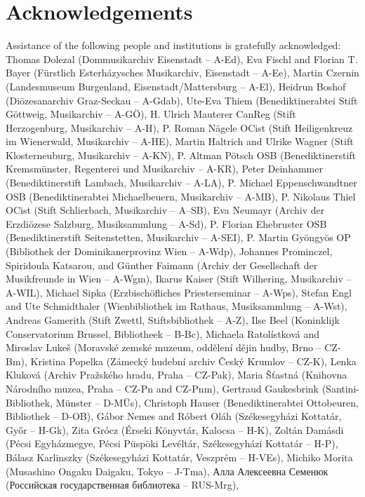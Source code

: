 \documentclass{ees}
\begin{document}
\section{Acknowledgements}

Assistance of the following people and institutions is gratefully acknowledged:
Thomas Dolezal (Dommusikarchiv Eisenstadt – A-Ed),
Eva Fischl and Florian T. Bayer (Fürstlich Esterházysches Musikarchiv, Eisenstadt – A-Ee),
Martin Czernin (Landesmuseum Burgenland, Eisenstadt/Mattersburg – A-El),
Heidrun Boshof (Diözesanarchiv Graz-Seckau – A-Gdab),
Ute-Eva Thiem (Benediktinerabtei Stift Göttweig, Musikarchiv – A-GÖ),
H. Ulrich Mauterer CanReg (Stift Herzogenburg, Musikarchiv – A-H),
P. Roman Nägele OCist (Stift Heiligenkreuz im Wienerwald, Musikarchiv – A-HE),
Martin Haltrich and Ulrike Wagner (Stift Klosterneuburg, Musikarchiv – A-KN),
P. Altman Pötsch OSB (Benediktinerstift Kremsmünster, Regenterei und Musikarchiv – A-KR),
Peter Deinhammer (Benediktinerstift Lambach, Musikarchiv – A-LA),
P. Michael Eppenschwandtner OSB (Benediktinerabtei Michaelbeuern, Musikarchiv – A-MB),
P. Nikolaus Thiel OCist (Stift Schlierbach, Musikarchiv – A–SB),
Eva Neumayr (Archiv der Erzdiözese Salzburg, Musiksammlung – A-Sd),
P. Florian Ehebruster OSB (Benediktinerstift Seitenstetten, Musikarchiv – A-SEI),
P. Martin Gyöngyös OP (Bibliothek der Dominikanerprovinz Wien – A-Wdp),
Johannes Prominczel, Spiridoula Katsarou, and Günther Faimann (Archiv der Gesellschaft der Musikfreunde in Wien – A-Wgm),
Ikarus Kaiser (Stift Wilhering, Musikarchiv – A-WIL),
Michael Sipka (Erzbischöfliches Priesterseminar – A-Wps),
Stefan Engl and Ute Schmidthaler (Wienbibliothek im Rathaus, Musiksammlung – A-Wst),
Andreas Gamerith (Stift Zwettl, Stiftsbibliothek – A-Z),
Ilse Beel (Koninklijk Conservatorium Brussel, Bibliotheek – B-Bc),
Michaela Ratolístková and Miroslav Lukeš (Moravské zemské muzeum, oddělení dějin hudby, Brno  – CZ-Bm),
Kristina Popelka (Zámecký hudební archiv Český Krumlov – CZ-K),
Lenka Kluková (Archiv Pražského hradu, Praha – CZ-Pak),
Maria Šťastná (Knihovna Národního muzea, Praha – CZ-Pn and CZ-Pnm),
Gertraud Gaukesbrink (Santini-Bibliothek, Münster – D-MÜs),
Christoph Hauser (Benediktinerabtei Ottobeuren, Bibliothek – D-OB),
Gábor Nemes and Róbert Oláh (Székesegyházi Kottatár, Győr – H-Gk),
Zita Grócz (Érseki Könyvtár, Kalocsa – H-K),
Zoltán Damásdi (Pécsi Egyházmegye, Pécsi Püspöki Levéltár, Székesegyházi Kottatár – H-P),
Bálasz Karlinszky (Székesegyházi Kottatár, Veszprém – H-VEs),
Michiko Morita (Musashino Ongaku Daigaku, Tokyo – J-Tma),
Алла Алексеевна Семенюк (Российская государственная библиотека – RUS-Mrg),
\end{document}
